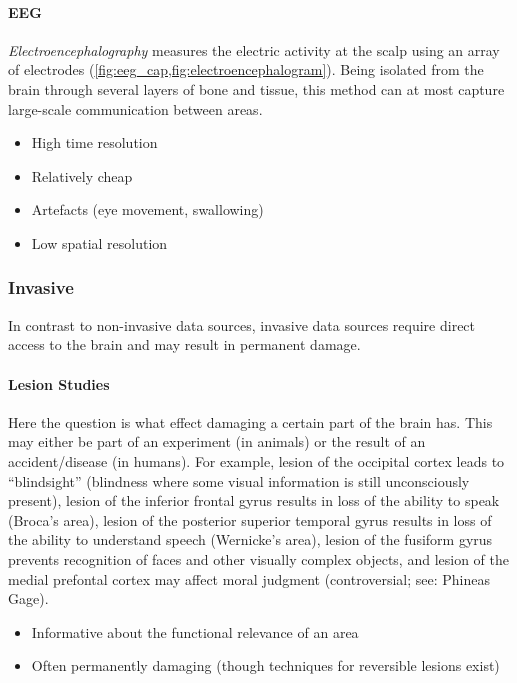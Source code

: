 \documentclass[10pt,letterpaper,oneside]{article}
\begin{document}
\paragraph{EEG}
\emph{Electroencephalography} measures the electric activity at the scalp using an array of electrodes (\cref{fig:eeg_cap,fig:electroencephalogram}). Being isolated from the brain through several layers of bone and tissue, this method can at most capture large-scale communication between areas.
\begin{multicols}{2}
	\begin{itemize}
		\item[\OPlus] High time resolution
		\item[\OMeh] Relatively cheap
		\item[\OMeh] Artefacts (eye movement, swallowing)
	\end{itemize}
	\columnbreak
	\begin{itemize}
		\item[\OMinus] Low spatial resolution
	\end{itemize}
\end{multicols}

\subsubsection{Invasive}

In contrast to non-invasive data sources, invasive data sources require direct access to the brain and may result in permanent damage.

\paragraph{Lesion Studies}
Here the question is what effect damaging a certain part of the brain has. This may either be part of an experiment (in animals) or the result of an accident/disease (in humans). For example,
lesion of the occipital cortex leads to \enquote{blindsight} (blindness where some visual information is still unconsciously present),
lesion of the inferior frontal gyrus results in loss of the ability to speak (Broca's area),
lesion of the posterior superior temporal gyrus results in loss of the ability to understand speech (Wernicke's area),
lesion of the fusiform gyrus prevents recognition of faces and other visually complex objects,
and lesion of the medial prefontal cortex may affect moral judgment (controversial; see: Phineas Gage).
\begin{multicols}{2}
	\begin{itemize}
		\item[\OPlus] Informative about the functional relevance of an area
	\end{itemize}
	\columnbreak
	\begin{itemize}
		\item[\OMinus] Often permanently damaging (though techniques for reversible lesions exist)
	\end{itemize}
\end{multicols}
\end{document}
